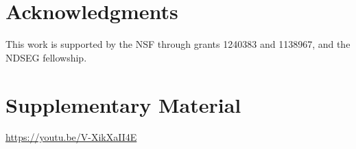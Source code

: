 \documentclass[letterpaper, 10 pt, conference]{ieeeconf}
\begin{document}












\section*{Acknowledgments}
This work is supported by the NSF through grants 1240383 and 1138967, and the NDSEG fellowship.

\section*{Supplementary Material}
\url{https://youtu.be/V-XikXaII4E}



%


\end{document}

